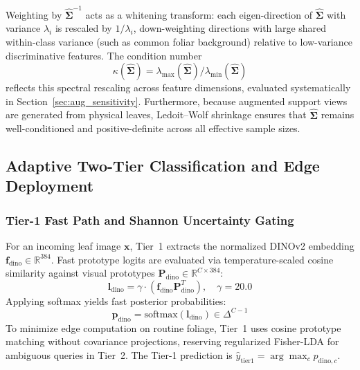 \documentclass[preprint,12pt]{elsarticle}
\begin{document}
Weighting by $\hat{\mathbf{\Sigma}}^{-1}$ acts as a whitening transform: each eigen-direction of $\hat{\mathbf{\Sigma}}$ with variance $\lambda_i$ is rescaled by $1/\lambda_i$, down-weighting directions with large shared within-class variance (such as common foliar background) relative to low-variance discriminative features. The condition number
\begin{equation}
    \kappa(\hat{\mathbf{\Sigma}}) = \lambda_{\max}(\hat{\mathbf{\Sigma}}) / \lambda_{\min}(\hat{\mathbf{\Sigma}})
    \label{eq:whitening_spread}
\end{equation}
reflects this spectral rescaling across feature dimensions, evaluated systematically in Section~\ref{sec:aug_sensitivity}. Furthermore, because augmented support views are generated from physical leaves, Ledoit--Wolf shrinkage ensures that $\hat{\mathbf{\Sigma}}$ remains well-conditioned and positive-definite across all effective sample sizes.

\subsection{Adaptive Two-Tier Classification and Edge Deployment}
\label{sec:edge_cascade}

\subsubsection{Tier-1 Fast Path and Shannon Uncertainty Gating}
For an incoming leaf image $\mathbf{x}$, Tier~1 extracts the normalized DINOv2 embedding $\mathbf{f}_{\text{dino}} \in \mathbb{R}^{384}$. Fast prototype logits are evaluated via temperature-scaled cosine similarity against visual prototypes $\mathbf{P}_{\text{dino}} \in \mathbb{R}^{C \times 384}$:
\begin{equation}
    \label{eq:tier1_logits}
    \mathbf{l}_{\text{dino}} = \gamma \cdot \left(\mathbf{f}_{\text{dino}} \mathbf{P}_{\text{dino}}^T\right), \quad \gamma = 20.0
\end{equation}
Applying softmax yields fast posterior probabilities:
\begin{equation}
    \label{eq:tier1_softmax}
    \mathbf{p}_{\text{dino}} = \text{softmax}(\mathbf{l}_{\text{dino}}) \in \Delta^{C-1}
\end{equation}
To minimize edge computation on routine foliage, Tier~1 uses cosine prototype matching without covariance projections, reserving regularized Fisher-LDA for ambiguous queries in Tier~2. The Tier-1 prediction is $\hat{y}_{\text{tier1}} = \arg\max_c p_{\text{dino}, c}$.
\end{document}
